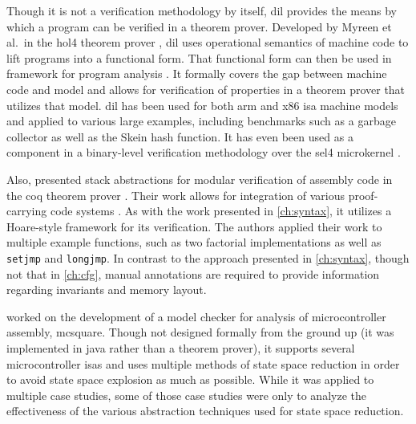 Though it is not a verification methodology by itself,
\gls{dil} provides the means by which a program can be verified in a theorem prover.
Developed by Myreen et al.\ in the \gls{hol4} theorem prover \autocite{slind2008brief},
\gls{dil} uses operational semantics of machine code
to lift programs into a functional form.
That functional form can then be used in  framework
for program analysis \autocite{myreen2007hoare}.
It formally covers the gap between machine code and  model
and allows for verification of properties in a theorem prover that utilizes that model.
\Gls{dil} has been used for both \gls{arm} and \gls{x86} \gls{isa} machine models
and applied to various large examples,
including benchmarks such as a garbage collector as well as the Skein hash function.
It has even been used as a component in a binary-level verification methodology
over the \gls{sel4} microkernel \autocite{sewell2013tvv}.

Also, \textcite{feng2006modular,feng2005sbca} presented stack abstractions
for modular verification of assembly code
in the \gls{coq} theorem prover \autocite{chlipala2013certified}.
Their work allows for integration
of various proof-carrying code systems \autocite{necula1997proof}.
As with the work presented in \cref{ch:syntax},
it utilizes a Hoare-style framework for its verification.
The authors applied their work to multiple example functions,
such as two factorial implementations
as well as \lstinline|setjmp| and \lstinline|longjmp|.
In contrast to the approach presented in \cref{ch:syntax},
though not that in \cref{ch:cfg},
manual annotations are required to provide information
regarding invariants and memory layout.

\Textcite{schlich2008phd} worked on the development of a model checker for analysis
of microcontroller assembly, \gls{mcsquare}.
Though not designed formally from the ground up (it was implemented in \gls{java} rather than a theorem prover), it supports several microcontroller \glspl{isa} and uses multiple methods of state space reduction in order to avoid state space explosion as much as possible.
While it was applied to multiple case studies,
some of those case studies were only to analyze the effectiveness
of the various abstraction techniques used for state space reduction.

